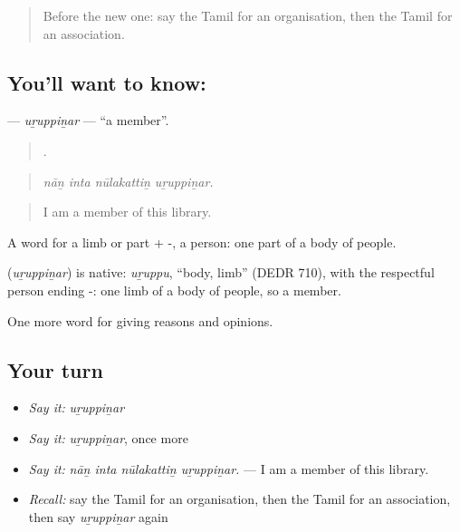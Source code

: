 \label{lesson:TA-C378-uruppinar}



\begin{quote}
Before the new one: say the Tamil for an organisation, then the Tamil for an association.
\end{quote}

\subsection*{You'll want to know: }
\textbf{} — \emph{uṟuppiṉar} — \textquotedblleft{}a member\textquotedblright{}.

\begin{quote}
   .
\end{quote}

\begin{quote}
\emph{nāṉ inta nūlakattiṉ uṟuppiṉar.}
\end{quote}

\begin{quote}
I am a member of this library.
\end{quote}

A word for a limb or part + -, a person: one part of a body of people.

\begin{cousinweb}
\textbf{} (\emph{uṟuppiṉar}) is native: \emph{uṟuppu}, \textquotedblleft{}body, limb\textquotedblright{} (DEDR 710), with the respectful person ending -: one limb of a body of people, so a member.
\end{cousinweb}

\begin{grammarlens}[title={What you've built}]
One more word for giving reasons and opinions.
\end{grammarlens}

\subsection*{Your turn}
\begin{itemize}
\raggedright
  \item \emph{Say it:} \emph{uṟuppiṉar}
  \item \emph{Say it:} \emph{uṟuppiṉar}, once more
  \item \emph{Say it:} \emph{nāṉ inta nūlakattiṉ uṟuppiṉar.} — I am a member of this library.
  \item \emph{Recall:} say the Tamil for an organisation, then the Tamil for an association, then say \emph{uṟuppiṉar} again
\end{itemize}

